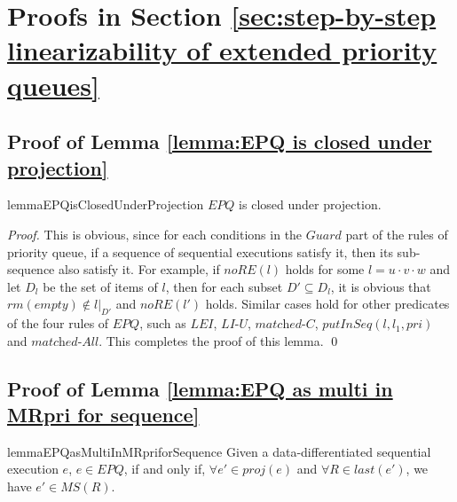 \section{Proofs in Section \ref{sec:step-by-step linearizability of extended priority queues}}
\label{sec:appendix in section step-by-step linearizability of extended priority queues}


\subsection{Proof of Lemma \ref{lemma:EPQ is closed under projection}}

\begin{restatable}{lemma}{EPQisClosedUnderProjection}
\label{lemma:EPQ is closed under projection}
$\textit{EPQ}$ is closed under projection.
\end{restatable}

\begin {proof}

This is obvious, since for each conditions in the $\textit{Guard}$ part of the rules of priority queue, if a sequence of sequential executions satisfy it, then its sub-sequence also satisfy it. For example, if $\textit{noRE}(l)$ holds for some $l = u \cdot v \cdot w$ and let $D_l$ be the set of items of $l$, then for each subset $D' \subseteq D_l$, it is obvious that $\textit{rm}(\textit{empty}) \notin l \vert_{ D' }$ and $\textit{noRE}(l')$ holds. Similar cases hold for other predicates of the four rules of $\textit{EPQ}$, such as $\textit{LEI}$, $\textit{LI-U}$, $\textit{matched-C}$, $\textit{putInSeq}(l,l_1,\textit{pri})$ and $\textit{matched-All}$. This completes the proof of this lemma. \qed
\end {proof}


\subsection{Proof of Lemma \ref{lemma:EPQ as multi in MRpri for sequence}}


\begin{restatable}{lemma}{EPQasMultiInMRpriforSequence}
\label{lemma:EPQ as multi in MRpri for sequence}
Given a data-differentiated sequential execution $e$, $e \in \textit{EPQ}$, if and only if, $\forall e' \in \textit{proj}(e)$ and $\forall R \in \textit{last}(e')$, we have $e' \in \textit{MS}(R)$.
\end{restatable}

